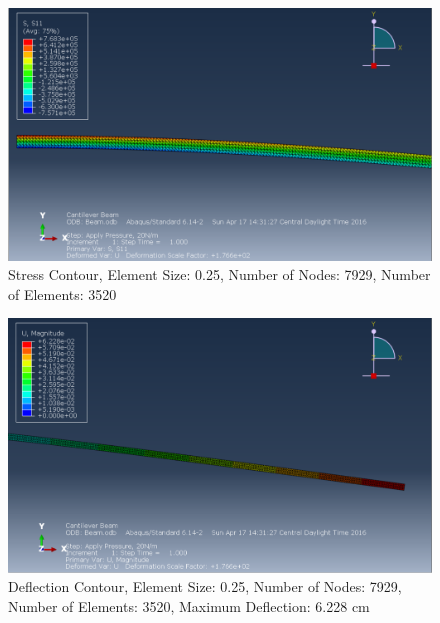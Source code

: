 \documentclass[a4paper]{article}
\begin{document}
\begin{figure}[ht]
\centering
\includegraphics[scale=.5]{6Nsize0_25Stress.PNG}
\caption{Stress Contour, Element Size: 0.25, Number of Nodes: 7929, Number of Elements: 3520}
\end{figure}
\begin{figure}[ht]
\centering
\includegraphics[scale=.5]{6Nsize0_25MDisplacement.PNG}
\caption{Deflection Contour, Element Size: 0.25, Number of Nodes: 7929, Number of Elements: 3520, Maximum Deflection: 6.228 cm}
\end{figure}
\end{document}
